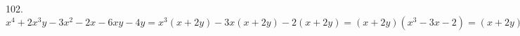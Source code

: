 102. $x^4+2x^3y-3x^2-2x-6xy-4y=x^3(x+2y)-3x(x+2y)-2(x+2y)=(x+2y)(x^3-3x-2)=
(x+2y)(x(x^2-1)-2(x+1))=(x+2y)(x(x-1)(x+1)-2(x+1))=
(x+2y)(x+1)(x^2-x-2)=(x+2y)(x+1)^2(x-2).$\\
